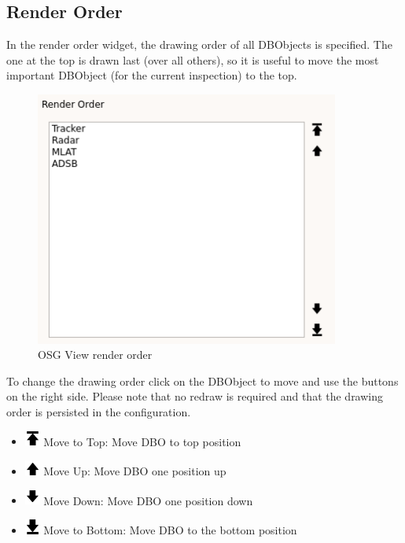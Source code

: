 \subsection{Render Order}

In the render order widget, the drawing order of all DBObjects is specified. The one at the top is drawn last (over all others), so it is useful to move the most important DBObject (for the current inspection) to the top.

\begin{figure}[H]
    \includegraphics[width=10cm,frame]{../screenshots/osgview_render_order.png}
  \caption{OSG View render order}
\end{figure}

To change the drawing order click on the DBObject to move and use the buttons on the right side. Please note that no redraw is required and that the drawing order is persisted in the configuration.
% 
 \begin{itemize}
 \item \includegraphics[width=0.5cm]{../../data/icons/top.png} Move to Top: Move DBO to top position
 \item \includegraphics[width=0.5cm]{../../data/icons/up.png} Move Up: Move DBO one position up
 \item \includegraphics[width=0.5cm]{../../data/icons/down.png} Move Down: Move DBO one position down
 \item \includegraphics[width=0.5cm]{../../data/icons/bottom.png} Move to Bottom: Move DBO to the bottom position
\end{itemize}
